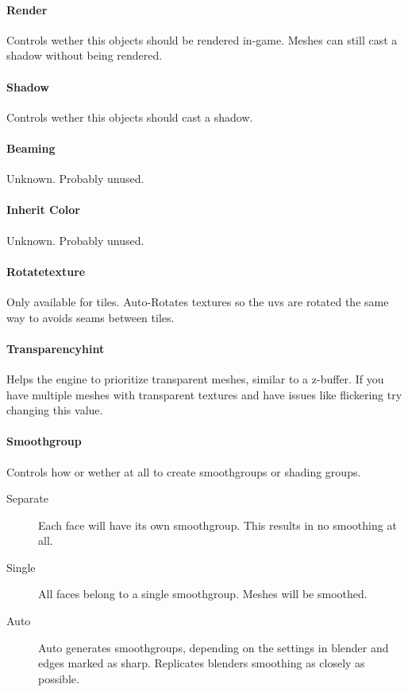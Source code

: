 \paragraph*{Render}
Controls wether this objects should be rendered in-game. Meshes can still
cast a shadow without being rendered.

\paragraph*{Shadow}
Controls wether this objects should cast a shadow.

\paragraph*{Beaming}
Unknown. Probably unused.

\paragraph*{Inherit Color}
Unknown. Probably unused.

\paragraph*{Rotatetexture}
Only available for tiles. Auto-Rotates textures so the uvs are rotated
the same way to avoids seams between tiles.

\paragraph*{Transparencyhint}
Helps the engine to prioritize transparent meshes, similar to a z-buffer. If
you have multiple meshes with transparent textures and have issues like
flickering try changing this value.

\paragraph*{Smoothgroup}
Controls how or wether at all to create smoothgroups or shading groups.
\begin{description}
    \item[Separate] Each face will have its own smoothgroup. This results in no smoothing at all.
    \item[Single] All faces belong to a single smoothgroup. Meshes will be smoothed.
    \item[Auto] Auto generates smoothgroups, depending on the settings in blender and edges marked as sharp. Replicates blenders smoothing as closely as possible.
\end{description}

